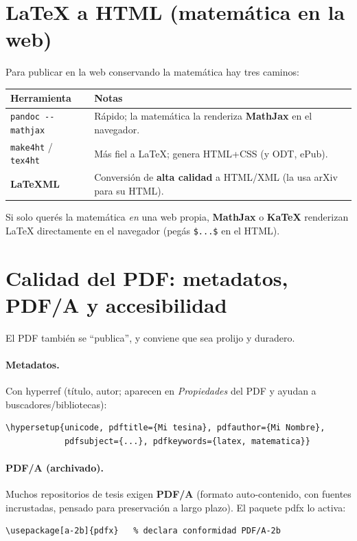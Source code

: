 \documentclass[11pt,a4paper]{article}
\newcommand{\pkg}[1]{\textsf{#1}}
\begin{document}
\section{LaTeX a HTML (matemática en la web)}
Para publicar en la web conservando la matemática hay tres caminos:
\begin{center}\small
\renewcommand{\arraystretch}{1.3}
\begin{tabularx}{\linewidth}{@{}lX@{}}
\toprule
\textbf{Herramienta} & \textbf{Notas} \\
\midrule
\texttt{pandoc -{}-mathjax} & Rápido; la matemática la renderiza \textbf{MathJax} en el navegador. \\
\texttt{make4ht} / \texttt{tex4ht} & Más fiel a \LaTeX; genera HTML+CSS (y ODT, ePub). \\
\textbf{LaTeXML} & Conversión de \textbf{alta calidad} a HTML/XML (la usa arXiv para su HTML). \\
\bottomrule
\end{tabularx}
\end{center}
Si solo querés la matemática \emph{en} una web propia, \textbf{MathJax} o
\textbf{KaTeX} renderizan \LaTeX{} directamente en el navegador (pegás
\verb|$...$| en el HTML).

\section{Calidad del PDF: metadatos, PDF/A y accesibilidad}
El PDF también se \enquote{publica}, y conviene que sea prolijo y duradero.

\paragraph{Metadatos.} Con \pkg{hyperref} (título, autor; aparecen en
\emph{Propiedades} del PDF y ayudan a buscadores/bibliotecas):
\begin{lstlisting}[style=tex]
\hypersetup{unicode, pdftitle={Mi tesina}, pdfauthor={Mi Nombre},
            pdfsubject={...}, pdfkeywords={latex, matematica}}
\end{lstlisting}

\paragraph{PDF/A (archivado).} Muchos repositorios de tesis exigen \textbf{PDF/A}
(formato auto-contenido, con fuentes incrustadas, pensado para preservación a
largo plazo). El paquete \pkg{pdfx} lo activa:
\begin{lstlisting}[style=tex]
\usepackage[a-2b]{pdfx}   % declara conformidad PDF/A-2b
\end{lstlisting}
\end{document}
